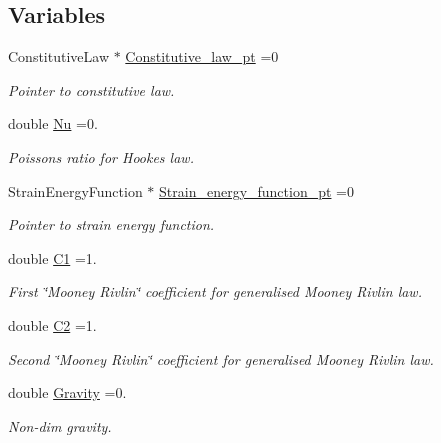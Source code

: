\subsection*{Variables}
\begin{DoxyCompactItemize}
\item 
Constitutive\+Law $\ast$ \hyperlink{namespaceGlobal__Physical__Variables_a2a37fb040c832ee7a086bb13bb02a100}{Constitutive\+\_\+law\+\_\+pt} =0
\begin{DoxyCompactList}\small\item\em Pointer to constitutive law. \end{DoxyCompactList}\item 
double \hyperlink{namespaceGlobal__Physical__Variables_a3962c36313826b19f216f6bbbdd6a477}{Nu} =0.
\begin{DoxyCompactList}\small\item\em Poisson\textquotesingle{}s ratio for Hooke\textquotesingle{}s law. \end{DoxyCompactList}\item 
Strain\+Energy\+Function $\ast$ \hyperlink{namespaceGlobal__Physical__Variables_a73135f793690b4386bf83bbefc7bf310}{Strain\+\_\+energy\+\_\+function\+\_\+pt} =0
\begin{DoxyCompactList}\small\item\em Pointer to strain energy function. \end{DoxyCompactList}\item 
double \hyperlink{namespaceGlobal__Physical__Variables_a849754fa7155c1a31481674ce4845658}{C1} =1.
\begin{DoxyCompactList}\small\item\em First \char`\"{}\+Mooney Rivlin\char`\"{} coefficient for generalised Mooney Rivlin law. \end{DoxyCompactList}\item 
double \hyperlink{namespaceGlobal__Physical__Variables_af9defd1b5745cce50d2c386b3ac0e0ae}{C2} =1.
\begin{DoxyCompactList}\small\item\em Second \char`\"{}\+Mooney Rivlin\char`\"{} coefficient for generalised Mooney Rivlin law. \end{DoxyCompactList}\item 
double \hyperlink{namespaceGlobal__Physical__Variables_a8b80d3e8d63b8d0a0ed435a2dd7fe2ad}{Gravity} =0.
\begin{DoxyCompactList}\small\item\em Non-\/dim gravity. \end{DoxyCompactList}\end{DoxyCompactItemize}


